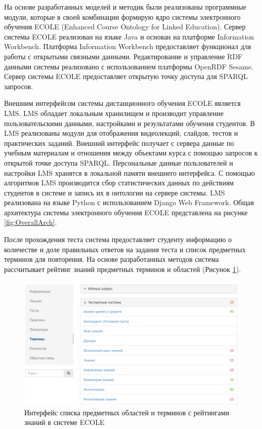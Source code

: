 На основе разработанных моделей и методик были реализованы программные модули, которые в своей комбинации формирую ядро системы электронного обучения ECOLE (Enhanced Course Ontology for Linked Education). Сервер системы ECOLE реализован на языке Java и основан на платформе Information Workbench. Платформа Information Workbench предоставляет функционал для работы с открытыми связными данными. Редактирование и управление RDF данными системы реализовано с использованием платформы OpenRDF Sesame. Сервер системы ECOLE предоставляет открытую точку доступа для SPARQL запросов. 

Внешним интерфейсом системы дистанционного обучения ECOLE является LMS. LMS обладает локальным хранилищем и производит управление пользовательскими данными, настройками и результатами обучения студентов. В LMS реализованы модули для отображения видеолекций, слайдов, тестов и практических заданий. Внешний интерфейс получает с сервера данные по учебным материалам и отношения между объектами курса с помощью запросов к открытой точке доступа SPARQL. Персональные данные пользователей и настройки LMS хранятся в локальной памяти внешнего интерфейса. С помощью алгоритмов LMS производится сбор статистических данных по действиям студентов в системе и запись их в онтологии на сервере системы. LMS реализована на языке Python с использованием Django Web Framework. Общая архитектура системы электронного обучения ECOLE представлена на рисунке \ref{fig:OverallArch}.



После прохождения теста система предоставляет студенту информацию о количестве и доле правильных ответов на задания теста и список предметных терминов для повторения. На основе разработанных методов система рассчитывает рейтинг знаний предметных терминов и областей (Рисунок \ref{fig:screen2}).

\begin{figure}[ht] 
  \center
  \includegraphics[scale=0.40]{screen2}
  \caption {Интерфейс списка предметных областей и терминов с рейтингами знаний в системе ECOLE} 
  \label{fig:screen2}
\end{figure}



